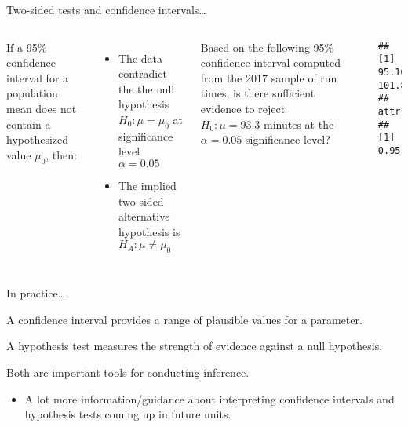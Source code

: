\documentclass[
  ignorenonframetext,
  aspectratio=169]{beamer}
\newenvironment{Shaded}{\begin{snugshade}}{\end{snugshade}}
\newcommand{\AttributeTok}[1]{\textcolor[rgb]{0.13,0.29,0.53}{#1}}
\newcommand{\DecValTok}[1]{\textcolor[rgb]{0.00,0.00,0.81}{#1}}
\newcommand{\FloatTok}[1]{\textcolor[rgb]{0.00,0.00,0.81}{#1}}
\newcommand{\FunctionTok}[1]{\textcolor[rgb]{0.13,0.29,0.53}{\textbf{#1}}}
\newcommand{\NormalTok}[1]{#1}
\newcommand{\SpecialCharTok}[1]{\textcolor[rgb]{0.81,0.36,0.00}{\textbf{#1}}}
\providecommand{\tightlist}{%
  \setlength{\itemsep}{0pt}\setlength{\parskip}{0pt}}
\newcommand{\columnsbegin}{\begin{columns}}
\newcommand{\columnsend}{\end{columns}}
\begin{document}
\begin{frame}[fragile]{Two-sided tests and confidence intervals\ldots{}}
\protect\hypertarget{two-sided-tests-and-confidence-intervals-1}{}
\columnsbegin


\footnotesize

If a 95\% confidence interval for a population mean does not contain a
hypothesized value \(\mu_0\), then:

\begin{itemize}
\item
  The data contradict the the null hypothesis \(H_0: \mu = \mu_0\) at
  significance level \(\alpha = 0.05\)
\item
  The implied two-sided alternative hypothesis is
  \(H_A: \mu \neq \mu_0\)
\end{itemize}


\footnotesize

Based on the following 95\% confidence interval computed from the 2017
sample of run times, is there sufficient evidence to reject
\(H_0: \mu = 93.3\) minutes at the \(\alpha = 0.05\) significance level?

\vspace{0.3cm}

\scriptsize

\begin{Shaded}
\end{Shaded}

\begin{verbatim}
## [1]  95.10571 101.83796
## attr(,"conf.level")
## [1] 0.95
\end{verbatim}

\columnsend
\end{frame}

\begin{frame}{In practice\ldots{}}
\protect\hypertarget{in-practice}{}
\small

A confidence interval provides a range of plausible values for a
parameter.

A hypothesis test measures the strength of evidence against a null
hypothesis.

Both are important tools for conducting inference.

\begin{itemize}
\tightlist
\item
  A lot more information/guidance about interpreting confidence
  intervals and hypothesis tests coming up in future units.
\end{itemize}
\end{frame}
\end{document}
